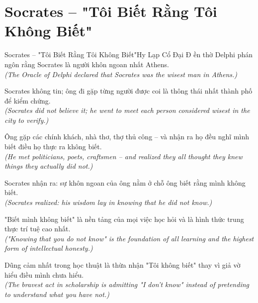 \section{Socrates -- "Tôi Biết Rằng Tôi Không Biết"}
\begin{truyen}{Socrates -- "Tôi Biết Rằng Tôi Không Biết"}{Hy Lạp Cổ Đại}
Đ ền thờ Delphi phán ngôn rằng Socrates là người khôn ngoan nhất Athens.\\
\textit{(The Oracle of Delphi declared that Socrates was the wisest man in Athens.)}

Socrates không tin; ông đi gặp từng người được coi là thông thái nhất thành phố để kiểm chứng.\\
\textit{(Socrates did not believe it; he went to meet each person considered wisest in the city to verify.)}

Ông gặp các chính khách, nhà thơ, thợ thủ công -- và nhận ra họ đều nghĩ mình biết điều họ thực ra không biết.\\
\textit{(He met politicians, poets, craftsmen -- and realized they all thought they knew things they actually did not.)}

Socrates nhận ra: sự khôn ngoan của ông nằm ở chỗ ông biết rằng mình không biết.\\
\textit{(Socrates realized: his wisdom lay in knowing that he did not know.)}

"Biết mình không biết" là nền tảng của mọi việc học hỏi và là hình thức trung thực trí tuệ cao nhất.\\
\textit{("Knowing that you do not know" is the foundation of all learning and the highest form of intellectual honesty.)}

\end{truyen}
\begin{baihoc}
  Dũng cảm nhất trong học thuật là thừa nhận "Tôi không biết" thay vì giả vờ hiểu điều mình chưa hiểu.\\
  \textit{(The bravest act in scholarship is admitting "I don't know" instead of pretending to understand what you have not.)}
\end{baihoc}

